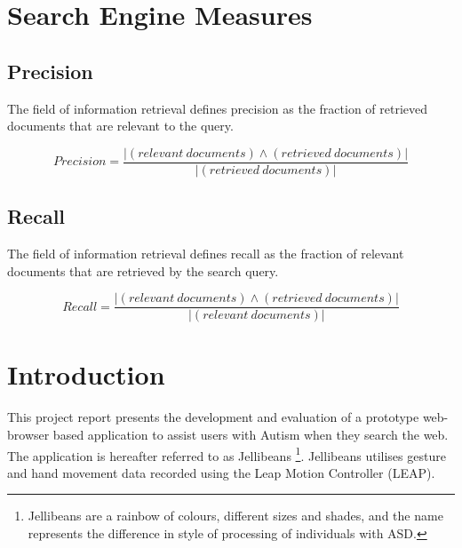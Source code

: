 \documentclass[a4paper, 11pt]{article}
\begin{document}
\section*{Search Engine Measures}
\newcommand{\cfplus}{\mathbin{\genfrac{}{}{0pt}{}{}{+}}}

\subsection*{Precision}
The field of information retrieval defines precision as the fraction of retrieved documents that are relevant to the query. 

\begin{equation*}
Precision
=\frac{|(relevant\ documents) \land (retrieved\ documents)|}{|(retrieved\ documents)|}
\end{equation*}

\subsection*{Recall}
The field of information retrieval defines recall as the fraction of relevant documents that are retrieved by the search query. 

\begin{equation*}
Recall
=\frac{|(relevant\ documents) \land (retrieved\ documents)|}{|(relevant\ documents)|}
\end{equation*}
\clearpage

\section{Introduction}\label{intro}

This project report presents the development and evaluation of a prototype web-browser based application to assist users with Autism when they search the web. The application is hereafter referred to as Jellibeans \footnote{Jellibeans are a rainbow of colours, different sizes and shades, and the name represents the difference in style of processing of individuals with ASD.}. Jellibeans utilises gesture and hand movement data recorded using the Leap Motion Controller (LEAP). 
\end{document}
